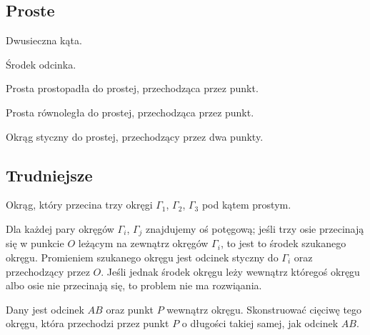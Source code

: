 \subsection{Proste}
\begin{problem}
    Dwusieczna kąta.
\end{problem}

\begin{problem}
    Środek odcinka.
\end{problem}

\begin{problem}
    Prosta prostopadła do prostej, przechodząca przez punkt.
\end{problem}

\begin{problem}
    Prosta równoległa do prostej, przechodząca przez punkt.
\end{problem}

\begin{problem}
    Okrąg styczny do prostej, przechodzący przez dwa punkty.
\end{problem}



\subsection{Trudniejsze}

\begin{problem}[Monge'a?]
    Okrąg, który przecina trzy okręgi $\Gamma_1$, $\Gamma_2$, $\Gamma_3$ pod kątem prostym.
\end{problem}

Dla każdej pary okręgów $\Gamma_i$, $\Gamma_j$ znajdujemy oś potęgową; jeśli trzy osie przecinają się w punkcie $O$ leżącym na zewnątrz okręgów $\Gamma_i$, to jest to środek szukanego okręgu.
Promieniem szukanego okręgu jest odcinek styczny do $\Gamma_i$ oraz przechodzący przez $O$.
Jeśli jednak środek okręgu leży wewnątrz któregoś okręgu albo osie nie przecinają się, to problem nie ma rozwiąania.

\begin{problem}
    Dany jest odcinek $AB$ oraz punkt $P$ wewnątrz okręgu.
    Skonstruować cięciwę tego okręgu, która przechodzi przez punkt $P$ o długości takiej samej, jak odcinek $AB$.
\end{problem}

